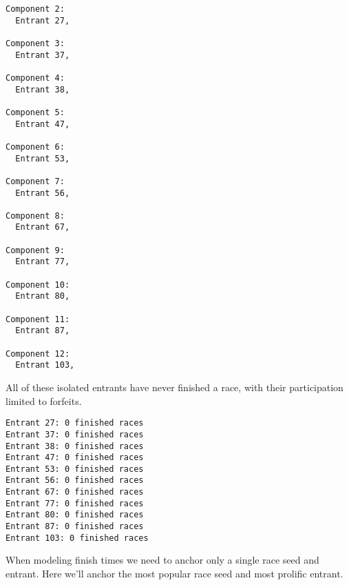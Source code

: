 \documentclass[
  letterpaper,
  DIV=11,
  numbers=noendperiod]{scrartcl}
\newenvironment{Shaded}{\begin{snugshade}}{\end{snugshade}}
\newcommand{\ControlFlowTok}[1]{\textcolor[rgb]{0.00,0.23,0.31}{#1}}
\newcommand{\DecValTok}[1]{\textcolor[rgb]{0.68,0.00,0.00}{#1}}
\newcommand{\FunctionTok}[1]{\textcolor[rgb]{0.28,0.35,0.67}{#1}}
\newcommand{\NormalTok}[1]{\textcolor[rgb]{0.00,0.23,0.31}{#1}}
\newcommand{\OtherTok}[1]{\textcolor[rgb]{0.00,0.23,0.31}{#1}}
\newcommand{\SpecialCharTok}[1]{\textcolor[rgb]{0.37,0.37,0.37}{#1}}
\newcommand{\StringTok}[1]{\textcolor[rgb]{0.13,0.47,0.30}{#1}}
\begin{document}
\begin{verbatim}
Component 2:
  Entrant 27,

Component 3:
  Entrant 37,

Component 4:
  Entrant 38,

Component 5:
  Entrant 47,

Component 6:
  Entrant 53,

Component 7:
  Entrant 56,

Component 8:
  Entrant 67,

Component 9:
  Entrant 77,

Component 10:
  Entrant 80,

Component 11:
  Entrant 87,

Component 12:
  Entrant 103,
\end{verbatim}

All of these isolated entrants have never finished a race, with their
participation limited to forfeits.

\begin{Shaded}
\end{Shaded}

\begin{verbatim}
Entrant 27: 0 finished races
Entrant 37: 0 finished races
Entrant 38: 0 finished races
Entrant 47: 0 finished races
Entrant 53: 0 finished races
Entrant 56: 0 finished races
Entrant 67: 0 finished races
Entrant 77: 0 finished races
Entrant 80: 0 finished races
Entrant 87: 0 finished races
Entrant 103: 0 finished races
\end{verbatim}

When modeling finish times we need to anchor only a single race seed and
entrant. Here we'll anchor the most popular race seed and most prolific
entrant.
\end{document}
